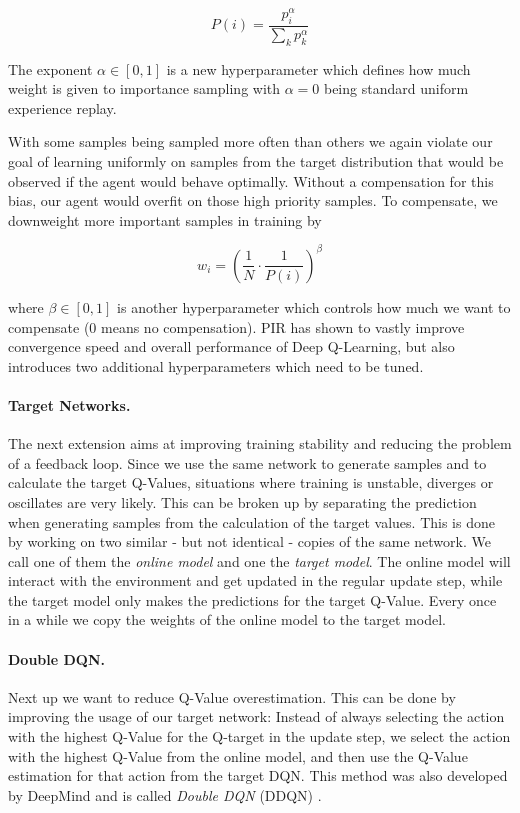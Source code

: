 \[P(i) = \frac{p_i^\alpha}{\sum_k p_k^\alpha}\]

The exponent $\alpha \in [0, 1]$ is a new hyperparameter which defines how much weight is given to importance sampling with $\alpha = 0$ being standard uniform experience replay.

With some samples being sampled more often than others we again violate our goal of learning uniformly on samples from the target distribution that would be observed if the agent would behave optimally. Without a compensation for this bias, our agent would overfit on those high priority samples. To compensate, we downweight more important samples in training by 

\[w_i = \left(\frac{1}{N} \cdot \frac{1}{P(i)}\right)^\beta\]

where $\beta \in [0, 1]$ is another hyperparameter which controls how much we want to compensate (0 means no compensation). PIR has shown to vastly improve convergence speed and overall performance of Deep Q-Learning, but also introduces two additional hyperparameters which need to be tuned.

\paragraph{Target Networks.}
The next extension aims at improving training stability and reducing the problem of a feedback loop. Since we use the same network to generate samples and to calculate the target Q-Values, situations where training is unstable, diverges or oscillates are very likely. This can be broken up by separating the prediction when generating samples from the calculation of the target values. This is done by working on two similar - but not identical - copies of the same network. We call one of them the \textit{online model} and one the \textit{target model}. The online model will interact with the environment and get updated in the regular update step, while the target model only makes the predictions for the target Q-Value. Every once in a while we copy the weights of the online model to the target model.

\paragraph{Double DQN.}
Next up we want to reduce Q-Value overestimation. This can be done by improving the usage of our target network: Instead of always selecting the action with the highest Q-Value for the Q-target in the update step, we select the action with the highest Q-Value from the online model, and then use the Q-Value estimation for that action from the target DQN. This method was also developed by DeepMind and is called \textit{Double DQN} (DDQN) \cite{van2016deep}.

